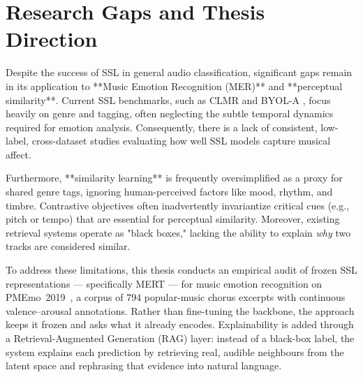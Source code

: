 \documentclass[12pt]{report}
\begin{document}
\section{Research Gaps and Thesis Direction}

Despite the success of SSL in general audio classification, significant gaps remain in its application to **Music Emotion Recognition (MER)** and **perceptual similarity**. Current SSL benchmarks, such as CLMR \cite{spijkervet_contrastive_2021} and BYOL-A \cite{niizumi_byol_2023}, focus heavily on genre and tagging, often neglecting the subtle temporal dynamics required for emotion analysis. Consequently, there is a lack of consistent, low-label, cross-dataset studies evaluating how well SSL models capture musical affect.

Furthermore, **similarity learning** is frequently oversimplified as a proxy for shared genre tags, ignoring human-perceived factors like mood, rhythm, and timbre. Contrastive objectives often inadvertently invariantize critical cues (e.g., pitch or tempo) that are essential for perceptual similarity. Moreover, existing retrieval systems operate as "black boxes," lacking the ability to explain \textit{why} two tracks are considered similar.

To address these limitations, this thesis conducts an empirical audit of frozen SSL representations --- specifically MERT --- for music emotion recognition on PMEmo~2019~\cite{zhang_pmemo_2018}, a corpus of $794$ popular-music chorus excerpts with continuous valence--arousal annotations. Rather than fine-tuning the backbone, the approach keeps it frozen and asks what it already encodes. Explainability is added through a Retrieval-Augmented Generation (RAG) layer: instead of a black-box label, the system explains each prediction by retrieving real, audible neighbours from the latent space and rephrasing that evidence into natural language.

%
%
%
%
\end{document}
